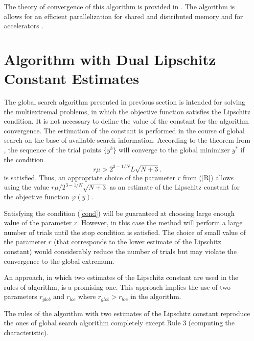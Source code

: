 \documentclass[runningheads]{llncs}
\begin{document}
The theory of convergence of this algorithm is provided in \cite{Strongin2000}. 
The algorithm is allows for an efficient
parallelization for shared and distributed memory \cite{Gergel2003}  and for accelerators \cite{Gergel2016}.


\section{Algorithm with Dual Lipschitz Constant Estimates}

The global search algorithm presented in previous section is intended for solving the multiextremal problems, in which the objective function satisfies the Lipschitz condition. It is not necessary to define the value of the constant for the algorithm convergence. The estimation of the constant is performed in the course of global search on the base of available search information. 
According to the theorem from \cite{Strongin2000}, the sequence of the trial points $\{y^k\}$ will converge to the global minimizer $y^*$ if the condition 
\begin{equation}\label{cond}
r\mu > 2^{3-1/N}L\sqrt{N+3}.
\end{equation}
\noindent is satisfied. Thus,  an appropriate choice of the parameter $r$ from (\ref{R}) allows using the value $r\mu / 2^{3-1/N}\sqrt{N+3}$ as an estimate of the Lipschitz constant for the objective function $\varphi(y)$.

Satisfying the condition (\ref{cond}) will be guaranteed at choosing large enough value of the parameter $r$. However, in this case the method will perform a large number of trials until the stop condition is satisfied.
The choice of small value of the parameter $r$ (that corresponds to the lower estimate of the Lipschitz constant) would considerably reduce the number of trials but may violate the convergence to the global extremum.

An approach, in which two estimates of the Lipschitz constant %
are used in the rules of algorithm, is a promising one. 
This approach implies the use of two parameters $r_{glob}$ and $r_{loc}$ where $r_{glob} > r_{loc}$ in the algorithm.

The rules of the algorithm with two estimates of the Lipschitz constant reproduce the ones of global search algorithm completely except Rule 3 (computing the characteristic).
\end{document}
